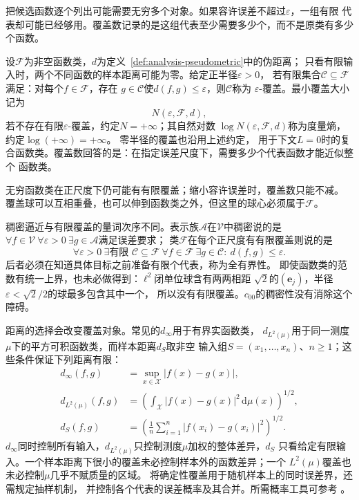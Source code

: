 把候选函数逐个列出可能需要无穷多个对象。如果容许误差不超过$\varepsilon$，一组有限
代表却可能已经够用。覆盖数记录的是这组代表至少需要多少个，而不是原类有多少个函数。
\begin{definition}[函数类的覆盖数与度量熵]
\label{def:functional-covering-number}
设$\mathcal F$为非空函数类，$d$为定义~\ref{def:analysis-pseudometric}中的伪距离；
只看有限输入时，两个不同函数的样本距离可能为零。给定正半径$\varepsilon>0$，
若有限集合$\mathcal{C}\subseteq\mathcal{F}$满足：对每个$f\in\mathcal{F}$，存在
$g\in\mathcal{C}$使$d(f,g)\leq\varepsilon$，则$\mathcal{C}$称为
$\varepsilon$-覆盖。最小覆盖大小记为
\[
  N(\varepsilon,\mathcal{F},d),
\]
若不存在有限$\varepsilon$-覆盖，约定$N=+\infty$；其自然对数
$\log N(\varepsilon,\mathcal F,d)$称为度量熵，约定$\log(+\infty)=+\infty$。
零半径的覆盖也沿用上述约定，
用于下文$L=0$时的复合函数类。覆盖数回答的是：在指定误差尺度下，需要多少个代表函数才能近似整个
函数类。
\end{definition}
无穷函数类在正尺度下仍可能有有限覆盖；缩小容许误差时，覆盖数只能不减。
覆盖球可以互相重叠，也可以伸到函数类之外，但这里的球心必须属于$\mathcal F$。

稠密逼近与有限覆盖的量词次序不同。表示族$\mathcal A$在$\mathcal V$中稠密说的是
$\forall f\in\mathcal V\ \forall\varepsilon>0\ \exists g\in\mathcal A$满足误差要求；
类$\mathcal F$在每个正尺度有有限覆盖则说的是
\[
 \forall\varepsilon>0\ \exists\text{有限 }\mathcal C\subseteq\mathcal F\
 \forall f\in\mathcal F\ \exists g\in\mathcal C:\ d(f,g)\leq\varepsilon.
\]
后者必须在知道具体目标之前准备有限个代表，称为全有界性。
即使函数类的范数有统一上界，也未必做得到：$\ell^2$闭单位球含有两两相距
$\sqrt2$的$(\bm e_j)$，半径$\varepsilon<\sqrt2/2$的球最多包含其中一个，
所以没有有限覆盖。$c_{00}$的稠密性没有消除这个障碍。

距离的选择会改变覆盖对象。常见的$d_\infty$用于有界实函数类，
$d_{L^2(\mu)}$用于同一测度$\mu$下的平方可积函数类，而样本距离$d_S$取非空
输入组$S=(x_1,\ldots,x_n)$、$n\geq1$；这些条件保证下列距离有限：
\begin{align*}
  d_{\infty}(f,g)
  &=
  \sup_{x\in\mathcal{X}}|f(x)-g(x)|,\\
  d_{L^2(\mu)}(f,g)
  &=
  \left(
    \int_{\mathcal{X}}|f(x)-g(x)|^2\,\mathrm{d}\mu(x)
  \right)^{1/2},\\
  d_S(f,g)
  &=
  \left(
    \frac1n\sum_{i=1}^{n}|f(x_i)-g(x_i)|^2
  \right)^{1/2}.
\end{align*}
$d_\infty$同时控制所有输入，$d_{L^2(\mu)}$只控制测度$\mu$加权的整体差异，$d_S$
只看给定有限输入。一个样本距离下很小的覆盖未必控制样本外的函数差异；一个
$L^2(\mu)$覆盖也未必控制$\mu$几乎不赋质量的区域。
将确定性覆盖用于随机样本上的同时误差界，还需规定抽样机制，
并控制各个代表的误差概率及其合并。所需概率工具可参考
。

